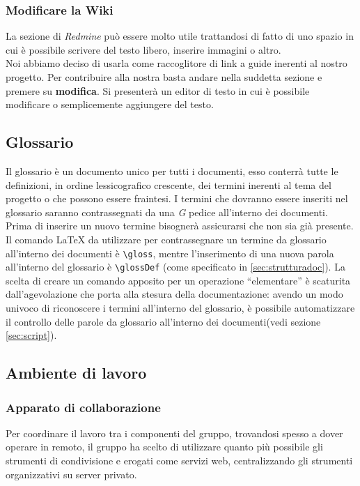 \documentclass{scalatekids-article}
\begin{document}
\subsubsection{Modificare la Wiki}
La sezione  di \textit{Redmine} può essere molto utile trattandosi di fatto di uno spazio in cui è possibile scrivere del testo libero, inserire immagini o altro.\\
Noi abbiamo deciso di usarla come raccoglitore di link a guide inerenti al nostro progetto.
Per contribuire alla nostra  basta andare nella suddetta sezione e premere su \textbf{modifica}. Si presenterà un editor di testo in cui è possibile modificare o semplicemente aggiungere del testo.

\subsection{Glossario}
Il glossario è un documento unico per tutti i documenti, esso conterrà tutte le
definizioni, in ordine lessicografico crescente, dei termini inerenti al tema
del progetto o che possono essere fraintesi. I termini che dovranno essere
inseriti nel glossario saranno contrassegnati da una \textit{G} pedice
all'interno dei documenti. Prima di inserire un nuovo termine bisognerà
assicurarsi che non sia già presente.\\ Il comando \LaTeX\xspace da utilizzare
per contrassegnare un termine da glossario all'interno dei documenti è
\verb=\gloss=, mentre l'inserimento di una nuova parola all'interno del
glossario è \verb=\glossDef= (come specificato in \ref{sec:strutturadoc}). La
scelta di creare un comando apposito per un operazione ``elementare'' è
scaturita dall'agevolazione che porta alla stesura della documentazione: avendo
un modo univoco di riconoscere i termini all'interno del glossario, è possibile
automatizzare il controllo delle parole da glossario all'interno dei
documenti(vedi sezione \ref{sec:script}).

\subsection{Ambiente di lavoro}
\subsubsection{Apparato di collaborazione}
Per coordinare il lavoro tra i componenti del gruppo, trovandosi spesso a dover
operare in remoto, il gruppo ha scelto di utilizzare quanto più possibile gli
strumenti di condivisione e  erogati come servizi web,
centralizzando gli strumenti organizzativi su server privato.
\end{document}
